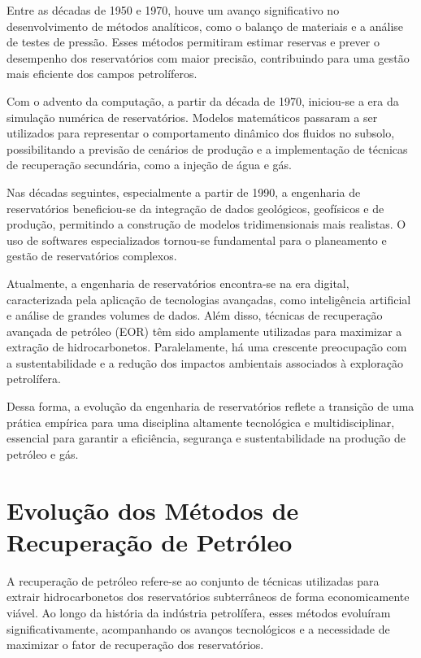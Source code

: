 \documentclass[12pt,a4paper]{report}
\begin{document}
Entre as décadas de 1950 e 1970, houve um avanço significativo no desenvolvimento de métodos analíticos, como o balanço de materiais e a análise de testes de pressão. Esses métodos permitiram estimar reservas e prever o desempenho dos reservatórios com maior precisão, contribuindo para uma gestão mais eficiente dos campos petrolíferos.

Com o advento da computação, a partir da década de 1970, iniciou-se a era da simulação numérica de reservatórios. Modelos matemáticos passaram a ser utilizados para representar o comportamento dinâmico dos fluidos no subsolo, possibilitando a previsão de cenários de produção e a implementação de técnicas de recuperação secundária, como a injeção de água e gás.

Nas décadas seguintes, especialmente a partir de 1990, a engenharia de reservatórios beneficiou-se da integração de dados geológicos, geofísicos e de produção, permitindo a construção de modelos tridimensionais mais realistas. O uso de softwares especializados tornou-se fundamental para o planeamento e gestão de reservatórios complexos.

Atualmente, a engenharia de reservatórios encontra-se na era digital, caracterizada pela aplicação de tecnologias avançadas, como inteligência artificial e análise de grandes volumes de dados. Além disso, técnicas de recuperação avançada de petróleo (EOR) têm sido amplamente utilizadas para maximizar a extração de hidrocarbonetos. Paralelamente, há uma crescente preocupação com a sustentabilidade e a redução dos impactos ambientais associados à exploração petrolífera.

Dessa forma, a evolução da engenharia de reservatórios reflete a transição de uma prática empírica para uma disciplina altamente tecnológica e multidisciplinar, essencial para garantir a eficiência, segurança e sustentabilidade na produção de petróleo e gás.

\chapter{Evolução dos Métodos de Recuperação de Petróleo}


A recuperação de petróleo refere-se ao conjunto de técnicas utilizadas para extrair hidrocarbonetos dos reservatórios subterrâneos de forma economicamente viável. Ao longo da história da indústria petrolífera, esses métodos evoluíram significativamente, acompanhando os avanços tecnológicos e a necessidade de maximizar o fator de recuperação dos reservatórios.
\end{document}
